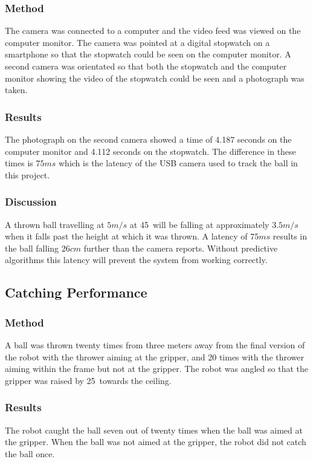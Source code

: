 \documentclass[conference]{IEEEtran}
\begin{document}
		\subsubsection{Method}
		The camera was connected to a computer and the video feed was viewed on the computer monitor. The camera was pointed at a digital stopwatch on a smartphone so that the stopwatch could be seen on the computer monitor. A second camera was orientated so that both the stopwatch and the computer monitor showing the video of the stopwatch could be seen and a photograph was taken. 
		\subsubsection{Results}
		The photograph on the second camera showed a time of 4.187 seconds on the computer monitor and 4.112 seconds on the stopwatch. The difference in these times is $75ms$ which is the latency of the USB camera used to track the ball in this project.

		\subsubsection{Discussion}A thrown ball travelling at $5m/s$ at 45\degree\ will be falling at approximately $3.5m/s$ when it falls past the height at which it was thrown.  A latency of $75ms$ results in the ball falling $26cm$ further than the camera reports. Without predictive algorithms this latency will prevent the system from working correctly.
		

	\subsection{Catching Performance}
	\subsubsection{Method}
	A ball was thrown twenty times from three meters away from the final version of the robot with the thrower aiming at the gripper, and 20 times with the thrower aiming within the frame but not at the gripper. The robot was angled so that the gripper was raised by 25\degree\ towards the ceiling. 
	\subsubsection{Results}
	The robot caught the ball seven out of twenty times when the ball was aimed at the gripper. When the ball was not aimed at the gripper, the robot did not catch the ball once.
\end{document}
